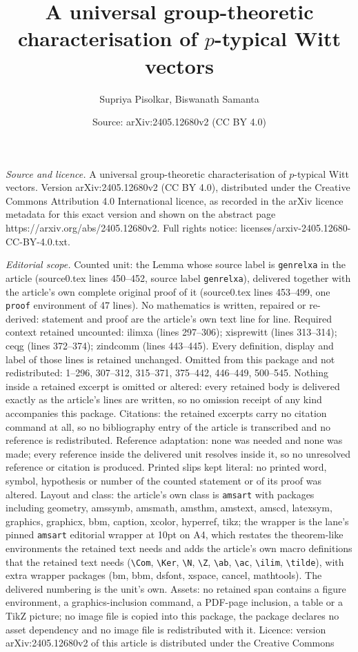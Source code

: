 \documentclass[10pt,a4paper]{amsart}
\title[A universal group-theoretic characterisation of $p$-typical ]{A universal group-theoretic characterisation of $p$-typical Witt vectors}
\author{Supriya Pisolkar, Biswanath Samanta}
\date{Source: arXiv:2405.12680v2 (CC BY 4.0)}
\begin{document}
\maketitle

\noindent\emph{Source and licence.} A universal group-theoretic characterisation of $p$-typical Witt vectors. Version arXiv:2405.12680v2 (CC BY 4.0), distributed under the Creative Commons Attribution 4.0 International licence, as recorded in the arXiv licence metadata for this exact version and shown on the abstract page https://arxiv.org/abs/2405.12680v2. Full rights notice: licenses/arxiv-2405.12680-CC-BY-4.0.txt.\par\smallskip

\noindent\textit{Editorial scope.} Counted unit: the Lemma whose source label is \texttt{genrelxa} in the article (source0.tex lines 450--452, source label \texttt{genrelxa}), delivered together with the article's own complete original proof of it (source0.tex lines 453--499, one \texttt{proof} environment of 47 lines). No mathematics is written, repaired or re-derived: statement and proof are the article's own text line for line. Required context retained uncounted: ilimxa (lines 297--306); xisprewitt (lines 313--314); ceqg (lines 372--374); zindcomm (lines 443--445). Every definition, display and label of those lines is retained unchanged. Omitted from this package and not redistributed: 1--296, 307--312, 315--371, 375--442, 446--449, 500--545. Nothing inside a retained excerpt is omitted or altered: every retained body is delivered exactly as the article's lines are written, so no omission receipt of any kind accompanies this package. Citations: the retained excerpts carry no citation command at all, so no bibliography entry of the article is transcribed and no reference is redistributed. Reference adaptation: none was needed and none was made; every reference inside the delivered unit resolves inside it, so no unresolved reference or citation is produced. Printed slips kept literal: no printed word, symbol, hypothesis or number of the counted statement or of its proof was altered. Layout and class: the article's own class is \texttt{amsart} with packages including geometry, amssymb, amsmath, amsthm, amstext, amscd, latexsym, graphics, graphicx, bbm, caption, xcolor, hyperref, tikz; the wrapper is the lane's pinned \texttt{amsart} editorial wrapper at 10pt on A4, which restates the theorem-like environments the retained text needs and adds the article's own macro definitions that the retained text needs (\texttt{\textbackslash Com}, \texttt{\textbackslash Ker}, \texttt{\textbackslash N}, \texttt{\textbackslash Z}, \texttt{\textbackslash ab}, \texttt{\textbackslash ac}, \texttt{\textbackslash ilim}, \texttt{\textbackslash tilde}), with extra wrapper packages (bm, bbm, dsfont, xspace, cancel, mathtools). The delivered numbering is the unit's own. Assets: no retained span contains a figure environment, a graphics-inclusion command, a PDF-page inclusion, a table or a TikZ picture; no image file is copied into this package, the package declares no asset dependency and no image file is redistributed with it. Licence: version arXiv:2405.12680v2 of this article is distributed under the Creative Commons 
\end{document}
